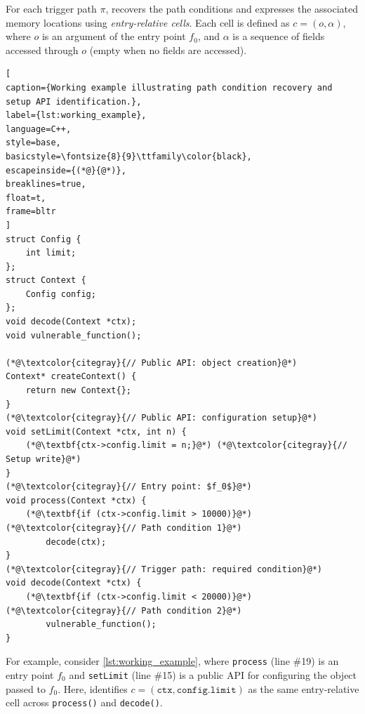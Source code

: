 For each trigger path $\pi$, \sys recovers the path conditions and expresses the associated memory locations using \textit{entry-relative cells}.
Each cell is defined as $c=(o,\alpha)$, where $o$ is an argument of the entry point $f_0$, and $\alpha$ is a sequence of fields accessed through $o$ (empty when no fields are accessed).

\begin{lstlisting}[
caption={Working example illustrating path condition recovery and setup API identification.},
label={lst:working_example},
language=C++,
style=base,
basicstyle=\fontsize{8}{9}\ttfamily\color{black},
escapeinside={(*@}{@*)},
breaklines=true,
float=t,
frame=bltr
]
struct Config {
    int limit;
};
struct Context {
    Config config;
};
void decode(Context *ctx);
void vulnerable_function();

(*@\textcolor{citegray}{// Public API: object creation}@*)
Context* createContext() {
    return new Context{};
}
(*@\textcolor{citegray}{// Public API: configuration setup}@*)
void setLimit(Context *ctx, int n) {
    (*@\textbf{ctx->config.limit = n;}@*) (*@\textcolor{citegray}{// Setup write}@*)
}
(*@\textcolor{citegray}{// Entry point: $f_0$}@*)
void process(Context *ctx) {
    (*@\textbf{if (ctx->config.limit > 10000)}@*) (*@\textcolor{citegray}{// Path condition 1}@*)
        decode(ctx);
}
(*@\textcolor{citegray}{// Trigger path: required condition}@*)
void decode(Context *ctx) {
    (*@\textbf{if (ctx->config.limit < 20000)}@*) (*@\textcolor{citegray}{// Path condition 2}@*)
        vulnerable_function();
}
\end{lstlisting}

For example, consider \autoref{lst:working_example}, where \texttt{process} (line \#19) is an entry point $f_0$ and \texttt{setLimit} (line \#15) is a public API for configuring the object passed to $f_0$.
Here, \sys identifies $c=(\texttt{ctx},\texttt{config.limit})$ as the same entry-relative cell across \texttt{process()} and \texttt{decode()}. %

